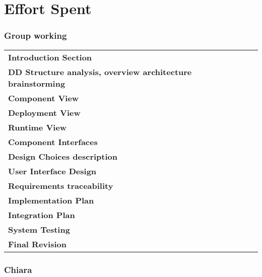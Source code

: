 \chapter{Effort Spent}
\subsection*{Group working}
\begin{table}[H]
    \begin{tabular}{lr}
        \toprule
        \textbf{Introduction Section}                                           & \textbf{} \\
        \textbf{DD Structure analysis, overview architecture brainstorming}     & \textbf{} \\
        \textbf{Component View}                                                 & \textbf{} \\
        \textbf{Deployment View}                                                  & \textbf{} \\
        \textbf{Runtime View}                                                  & \textbf{} \\
        \textbf{Component Interfaces}                                            & \textbf{} \\
        \textbf{Design Choices description}                                            & \textbf{} \\
        \textbf{User Interface Design}                                            & \textbf{} \\
        \textbf{Requirements traceability}                                            & \textbf{} \\
        \textbf{Implementation Plan}                                            & \textbf{} \\
        \textbf{Integration Plan}                                            & \textbf{} \\
        \textbf{System Testing}                                            & \textbf{} \\
        \textbf{Final Revision}                                            & \textbf{} \\

        \bottomrule
    \end{tabular}
\end{table}

\subsection*{Chiara}
\begin{table}[H]
    \begin{tabular}{lr}
        \toprule
    
        \bottomrule
    \end{tabular}
\end{table}

